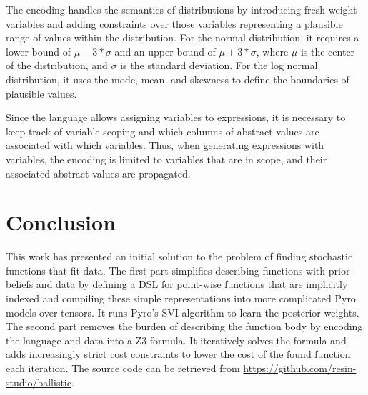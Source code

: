 \documentclass[letterpaper]{llncs}
\begin{document}
The encoding handles the semantics of distributions by introducing fresh weight variables  
and adding constraints over those variables representing a plausible range of values
within the distribution. For the normal distribution, it requires a lower bound of 
$\mu - 3 * \sigma$ and an upper bound of $\mu + 3 * \sigma$,
where $\mu$ is the center of the distribution, and $\sigma$ is the standard deviation.
For the log normal distribution, it uses the mode, mean, and skewness to define the boundaries
of plausible values. 

Since the language allows assigning variables to expressions, it is necessary to keep track
of variable scoping and which columns of abstract values are associated with which variables. 
Thus, when generating expressions with variables, the encoding is limited to variables that
are in scope, and their associated abstract values are propagated.

\section{Conclusion}
This work has presented an initial solution to the problem of finding stochastic functions that fit data.
The first part simplifies describing functions with prior beliefs and data by defining a DSL for
point-wise functions that are implicitly indexed and compiling these simple representations
into more complicated Pyro models over tensors. It runs Pyro's SVI algorithm to learn the posterior weights. 
The second part removes the burden of describing the function body by encoding the language and data into a Z3 formula. 
It iteratively solves the formula and adds increasingly strict cost constraints to lower
the cost of the found function each iteration.  
The source code can be retrieved from \url{https://github.com/resin-studio/ballistic}.

\newpage
\end{document}
